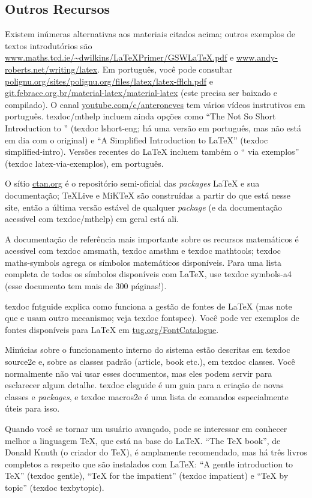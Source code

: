 \subsection{Outros Recursos}

Existem inúmeras alternativas aos materiais citados acima; outros exemplos de
textos introdutórios são \url{www.maths.tcd.ie/~dwilkins/LaTeXPrimer/GSWLaTeX.pdf}
e \url{www.andy-roberts.net/writing/latex}. Em português, você pode
consultar \url{polignu.org/sites/polignu.org/files/latex/latex-fflch.pdf}
e \url{git.febrace.org.br/material-latex/material-latex} (este precisa ser
baixado e compilado). O canal \url{youtube.com/c/anteroneves} tem vários
vídeos instrutivos em português. \textsf{texdoc/mthelp} incluem ainda
opções como ``The Not So Short Introduction to \LaTeXe{}'' (\textsf{texdoc
lshort-eng}; há uma versão em português, mas não está em dia com o
original) e ``A Simplified Introduction to \LaTeX{}'' (\textsf{texdoc
simplified-intro}). Versões recentes do \LaTeX{} incluem também o
``\LaTeXe{} via exemplos'' (\textsf{texdoc latex-via-exemplos}), em português.

O sítio \url{ctan.org} é o repositório semi-oficial das \textit{packages}
\LaTeX{} e sua documentação; \TeX{}Live e MiK\TeX{} são construídas a
partir do que está nesse site, então a última versão estável de qualquer
\textit{package} (e da documentação acessível com \textsf{texdoc/mthelp})
em geral está ali.

A documentação de referência mais importante sobre os recursos matemáticos
é acessível com \textsf{texdoc amsmath}, \textsf{texdoc amsthm} e
\textsf{texdoc mathtools}; \textsf{texdoc maths-symbols} agrega os símbolos
matemáticos disponíveis. Para uma lista completa de todos os símbolos
disponíveis com \LaTeX{}, use \textsf{texdoc symbols-a4} (esse documento
tem mais de 300 páginas!).

\textsf{texdoc fntguide} explica como funciona a gestão de fontes de
\LaTeX{} (mas note que \LuaLaTeX{} e \XeLaTeX{} usam outro mecanismo;
veja \textsf{texdoc fontspec}). Você pode ver exemplos de fontes
disponíveis para \LaTeX{} em \url{tug.org/FontCatalogue}.

Minúcias sobre o funcionamento interno do sistema estão descritas em
\textsf{texdoc source2e} e, sobre as classes padrão (\textsf{article, book}
etc.), em \textsf{texdoc classes}. Você normalmente não vai usar esses
documentos, mas eles podem servir para esclarecer algum detalhe.
\textsf{texdoc clsguide} é um guia para a criação de novas classes e
\textit{packages}, e \textsf{texdoc macros2e} é uma lista de comandos
especialmente úteis para isso.

Quando você se tornar um usuário avançado, pode se interessar em conhecer
melhor a linguagem \TeX{}, que está na base do \LaTeX{}. ``The \TeX{} book'',
de Donald Knuth (o criador do \TeX), é amplamente recomendado, mas há três
livros completos a respeito que são instalados com \LaTeX{}: ``A gentle
introduction to \TeX{}'' (\textsf{texdoc gentle}), ``\TeX{} for the
impatient'' (\textsf{texdoc impatient}) e ``\TeX{} by topic'' (\textsf{texdoc
texbytopic}).
